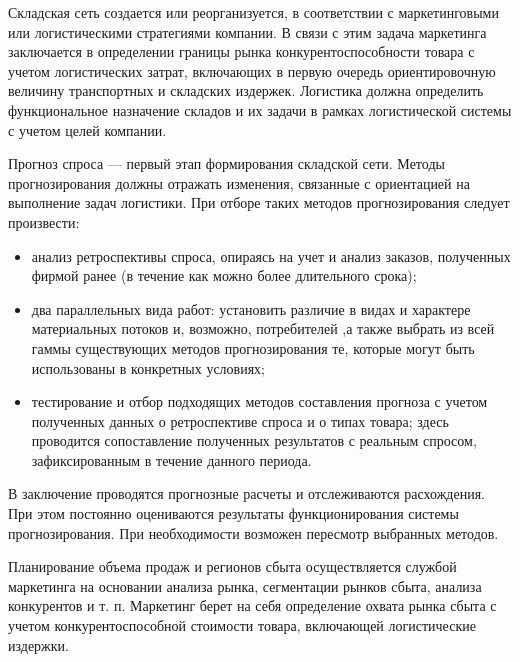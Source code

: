 Складская сеть создается или реорганизуется, в соответствии с маркетинговыми или логистическими стратегиями компании.
В связи с этим задача маркетинга заключается в определении границы рынка конкурентоспособности товара с учетом логистических затрат, включающих в первую очередь ориентировочную величину транспортных и складских издержек.
Логистика должна определить функциональное назначение складов и их задачи в рамках логистической системы с учетом целей компании.

Прогноз спроса --- первый этап формирования складской сети.
Методы прогнозирования должны отражать изменения, связанные с ориентацией на выполнение задач логистики.
При отборе таких методов прогнозирования следует произвести:
\begin{itemize}
	\item анализ ретроспективы спроса, опираясь на учет и анализ заказов, полученных фирмой ранее (в течение как можно более длительного срока);
	\item два параллельных вида работ: установить различие в видах и характере материальных потоков и, возможно, потребителей ,а также выбрать из всей гаммы существующих методов прогнозирования те, которые могут быть использованы в конкретных условиях;
	\item тестирование и отбор подходящих методов составления прогноза с учетом полученных данных о ретроспективе спроса и о типах товара; здесь проводится сопоставление полученных результатов с реальным спросом, зафиксированным в течение данного периода.
\end{itemize}

В заключение проводятся прогнозные расчеты и отслеживаются расхождения.
При этом постоянно оцениваются результаты функционирования системы прогнозирования.
При необходимости возможен пересмотр выбранных методов.

Планирование объема продаж и регионов сбыта осуществляется службой маркетинга на основании анализа рынка, сегментации рынков сбыта, анализа конкурентов и т. п.
Маркетинг берет на себя определение охвата рынка сбыта с учетом конкурентоспособной стоимости товара, включающей логистические издержки.
